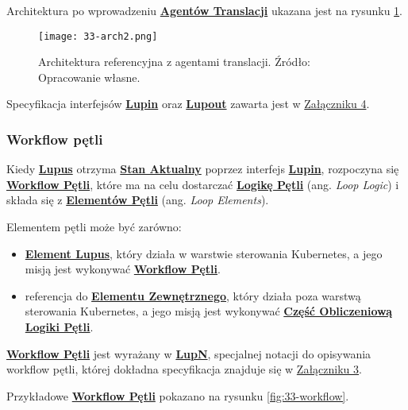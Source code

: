 Architektura po wprowadzeniu \hyperlink{def:agent-translacji}{\textbf{Agentów Translacji}} ukazana jest na rysunku \ref{fig:33-arch2}.

\begin{figure}[!h]
    \centering \texttt{[image: 33-arch2.png]}
    \caption{Architektura referencyjna z agentami translacji. Źródło: Opracowanie własne.}\label{fig:33-arch2}
\end{figure}

Specyfikacja interfejsów \hyperlink{def:interfejs-lupin}{\textbf{Lupin}} oraz \hyperlink{def:interfejs-lupout}{\textbf{Lupout}} zawarta jest w \hyperref[appendix:4]{Załączniku 4}.

\subsubsection{Workflow pętli}

Kiedy \hyperlink{def:lupus}{\textbf{Lupus}} otrzyma \hyperlink{def:stan-aktualny}{\textbf{Stan Aktualny}} poprzez interfejs \hyperlink{def:interfejs-lupin}{\textbf{Lupin}}, rozpoczyna się \hyperlink{def:workflow-petli}{\textbf{Workflow Pętli}}, które ma na celu dostarczać \hyperlink{def:logika-petli}{\textbf{Logikę Pętli}} (ang. \textit{Loop Logic}) i składa się z \hyperlink{def:element-petli}{\textbf{Elementów Pętli}} (ang. \textit{Loop Elements}). 

Elementem pętli może być zarówno:
\begin{itemize}
    \item \hyperlink{def:element-lupus}{\textbf{Element Lupus}}, który działa w warstwie sterowania Kubernetes, a jego misją jest wykonywać \hyperlink{def:workflow-petli}{\textbf{Workflow Pętli}}.
    \item referencja do \hyperlink{def:element-zewnetrzny}{\textbf{Elementu Zewnętrznego}}, który działa poza warstwą sterowania Kubernetes, a jego misją jest wykonywać \hyperlink{def:czesc-obliczeniowa}{\textbf{Część Obliczeniową}} \hyperlink{def:logika-petli}{\textbf{Logiki Pętli}}.
\end{itemize}

\hyperlink{def:workflow-petli}{\textbf{Workflow Pętli}} jest wyrażany w \hyperlink{def:lupn}{\textbf{LupN}}, specjalnej notacji do opisywania workflow pętli, której dokładna specyfikacja znajduje się w \hyperref[appendix:3]{Załączniku 3}.

Przykładowe \hyperlink{def:workflow-petli}{\textbf{Workflow Pętli}} pokazano na rysunku \ref{fig:33-workflow}.

